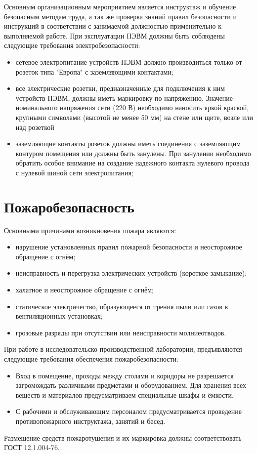 Основным организационным мероприятием является инструктаж и обучение безопасным методам труда, а так же проверка знаний правил безопасности и инструкций в соответствии с занимаемой должностью применительно к выполняемой работе.
При эксплуатации ПЭВМ должны быть соблюдены  следующие требования электробезопасности:
\begin{itemize}
	\item сетевое электропитание  устройств ПЭВМ должно производиться только от розеток типа "Европа" с заземляющими контактами;
	\item все электрические розетки, предназначенные для подключения к ним устройств ПЭВМ, должны иметь маркировку по напряжению. Значение  номинального напряжения сети (220 В) необходимо наносить яркой краской, крупными символами (высотой не менее 50 мм) на стене или щите, возле или над розеткой
	\item заземляющие контакты розеток должны иметь  соединения с заземляющим контуром помещения или должны быть занулены. При занулении необходимо обратить особое внимание на создание надежного контакта нулевого провода с нулевой шиной сети электропитания;
\end{itemize}

\section{Пожаробезопасность}

Основными причинами возникновения пожара являются:
\begin{itemize}
	\item нарушение установленных правил пожарной безопасности и неосторожное обращение с огнём;
	\item неисправность и перегрузка электрических устройств (короткое замыкание);
	\item халатное и неосторожное обращение с огнём;
	\item статическое электричество, образующееся от трения пыли или газов в вентиляционных установках;
	\item грозовые разряды при отсутствии или неисправности молниеотводов.
\end{itemize}
При работе в исследовательско-производственной  лаборатории, предъявляются следующие требования обеспечения пожаробезопасности:
\begin{itemize}
	\item Вход в помещение, проходы между столами и коридоры не разрешается загромождать различными предметами и оборудованием. Для хранения всех веществ и материалов предусматриваем специальные шкафы и ёмкости.
	\item С рабочими и обслуживающим персоналом предусматривается проведение противопожарного инструктажа, занятий и бесед.
\end{itemize}
Размещение средств пожаротушения и их маркировка должны соответствовать ГОСТ 12.1.004-76.